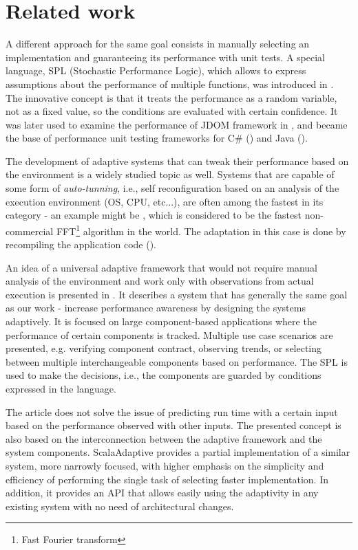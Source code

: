 \chapter{Related work}

A different approach for the same goal consists in manually selecting an implementation and guaranteeing its performance with unit tests. A special language, SPL (Stochastic Performance Logic), which allows to express assumptions about the performance of multiple functions, was introduced in \cite{bulej_capturing_2012}. The innovative concept is that it treats the performance as a random variable, not as a fixed value, so the conditions are evaluated with certain confidence. It was later used to examine the performance of JDOM framework in \cite{horky_performance_2013}, and became the base of performance unit testing frameworks for C\# (\cite{Trojanek:Thesis:2013}) and Java (\cite{Kotrc:Thesis:2015}).

The development of adaptive systems that can tweak their performance based on the environment is a widely studied topic as well. Systems that are capable of some form of \textit{auto-tunning}, i.e., self reconfiguration based on an analysis of the execution environment (OS, CPU, etc...), are often among the fastest in its category - an example might be \cite{frigo_fftw:_1998},  which is considered to be the fastest non-commercial FFT\footnote{Fast Fourier transform} algorithm in the world. The adaptation in this case is done by recompiling the application code (\cite{frigo_fast_1999}).

An idea of a universal adaptive framework that would not require manual analysis of the environment and work only with observations from actual execution is presented in \cite{bulej_performance_2012}. It describes a system that has generally the same goal as our work - increase performance awareness by designing the systems adaptively. It is focused on large component-based applications where the performance of certain components is tracked. Multiple use case scenarios are presented, e.g. verifying component contract, observing trends, or selecting between multiple interchangeable components based on performance. The SPL is used to make the decisions, i.e., the components are guarded by conditions expressed in the language.

The article does not solve the issue of predicting run time with a certain input based on the performance observed with other inputs. The presented concept is also based on the interconnection between the adaptive framework and the system components. ScalaAdaptive provides a partial implementation of a similar system, more narrowly focused, with higher emphasis on the simplicity and efficiency of performing the single task of selecting faster implementation. In addition, it provides an API that allows easily using the adaptivity in any existing system with no need of architectural changes.

